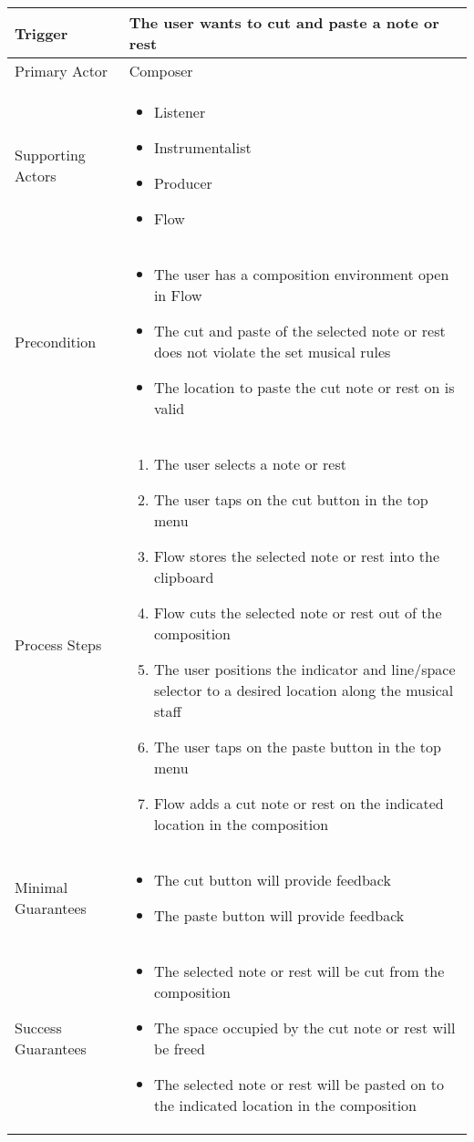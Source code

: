 \begin{longtable}{|X|X|}
\hline
Trigger & 
The user wants to cut and paste a note or rest\\
\hline
Primary Actor & 
Composer \\
\hline
Supporting Actors & 
\begin{itemize}
\item Listener
\item Instrumentalist
\item Producer
\item Flow
\end{itemize} \\
\hline
Precondition & 
\begin{itemize}
\item The user has a composition environment open in Flow
\item The cut and paste of the selected note or rest does not violate the set musical rules
\item The location to paste the cut note or rest on is valid
\end{itemize} \\
\hline
Process Steps & 
\begin{enumerate}
\item The user selects a note or rest
\item The user taps on the cut button in the top menu
\item Flow stores the selected note or rest into the clipboard
\item Flow cuts the selected note or rest out of the composition
\item The user positions the indicator and line/space selector to a desired location along the musical staff
\item The user taps on the paste button in the top menu
\item Flow adds a cut note or rest on the indicated location in the composition
\end{enumerate} \\
\hline
Minimal Guarantees & 
\begin{itemize}
  \item The cut button will provide feedback
  \item The paste button will provide feedback
\end{itemize} \\
\hline
Success Guarantees & 
\begin{itemize}
  \item The selected note or rest will be cut from the composition 
  \item The space occupied by the cut note or rest will be freed
  \item The selected note or rest will be pasted on to the indicated location in the composition
\end{itemize} \\
\hline
\end{longtable}